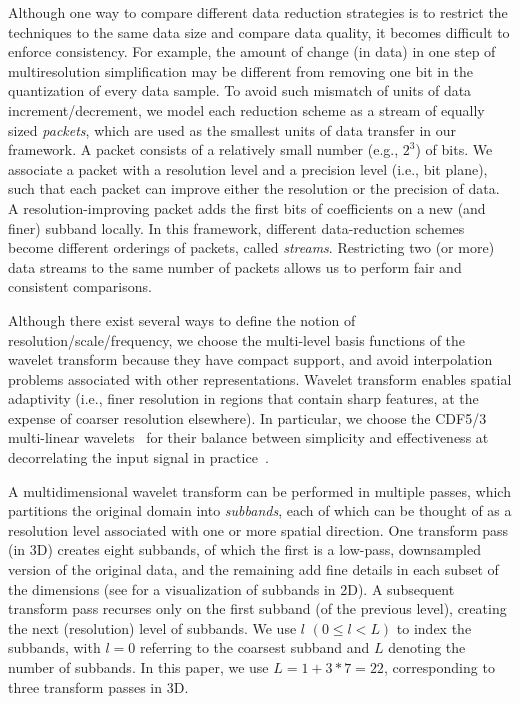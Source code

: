 Although one way to compare different data reduction strategies is to restrict the techniques to the
same data size and compare data quality, it becomes difficult to enforce consistency. For example,
the amount of change (in data) in one step of multiresolution simplification may be different from
removing one bit in the quantization of every data sample. To avoid such mismatch of units of data
increment/decrement, we model each reduction scheme as a stream of equally sized \emph{packets},
which are used as the smallest units of data transfer in our framework. A packet consists of a
relatively small number (e.g., $2^3$) of bits. We associate a packet
with a resolution level and a precision level (i.e., bit plane), such that each packet can improve
either the resolution or the precision of data. A resolution-improving packet adds the first bits of
coefficients on a new (and finer) subband locally. In this framework, different data-reduction
schemes become different orderings of packets, called \emph{streams}. Restricting two (or more) data
streams to the same number of packets allows us to perform fair and consistent comparisons.

Although there exist several ways to define the notion of resolution/scale/frequency, we choose the
multi-level basis functions of the wavelet transform because they have compact support, and avoid
interpolation problems associated with other representations. Wavelet transform enables spatial
adaptivity (i.e., finer resolution in regions that contain sharp features, at the expense of coarser
resolution elsewhere). In particular, we choose the CDF5/3 multi-linear wavelets~\cite{cdf-wavelets}
for their balance between simplicity and effectiveness at decorrelating the input signal in
practice~\cite{jpeg2000}.

A multidimensional wavelet transform can be performed in multiple passes, which partitions the
original domain into \emph{subbands}, each of which can be thought of as a resolution level
associated with one or more spatial direction. One transform pass (in 3D) creates eight subbands, of
which the first is a low-pass, downsampled version of the original data, and the remaining add fine
details in each subset of the dimensions (see  for a visualization of subbands in
2D). A subsequent transform pass recurses only on the first subband (of the previous level), creating the next (resolution)
level of subbands. We use $l$ $(0 \leq l < L)$ to index the subbands, with $l = 0$ referring to the
coarsest subband and $L$ denoting the number of subbands. In this paper, we use $L=1 + 3*7=22$,
corresponding to three transform passes in 3D.

